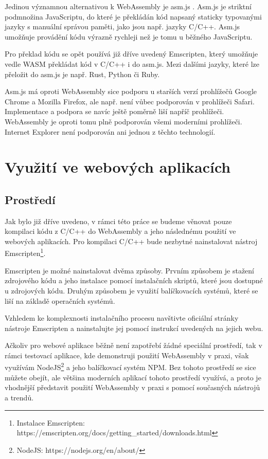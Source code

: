 \documentclass{{template/ctuthesis}}
\begin{document}
Jedinou významnou alternativou k WebAssembly je asm.js \cite{asm-js}. Asm.js je striktní podmnožina JavaScriptu, do které je překládán kód napsaný staticky typovanými jazyky s manuální správou paměti, jako jsou např. jazyky C/C++. Asm.js umožňuje provádění kódu výrazně rychleji než je tomu u běžného JavaScriptu.

Pro překlad kódu se opět používá již dříve uvedený Emscripten, který umožňuje vedle WASM překládat kód v C/C++ i do asm.js. Mezi dalšími jazyky, které lze přeložit do asm.js je např. Rust, Python či Ruby.

Asm.js má oproti WebAssembly sice podporu u starších verzí prohlížečů Google Chrome a Mozilla Firefox, ale např. není vůbec podporován v prohlížeči Safari. Implementace a podpora se navíc ještě poměrně liší napříč prohlížeči. WebAssembly je oproti tomu plně podporován všemi moderními prohlížeči. Internet Explorer není podporován ani jednou z těchto technologií.


\chapter{Využití ve webových aplikacích}

\section{Prostředí}

Jak bylo již dříve uvedeno, v rámci této práce se budeme věnovat pouze kompilaci kódu z C/C++ do WebAssembly a jeho následnému použití ve webových aplikacích. Pro kompilaci C/C++ bude nezbytné nainstalovat nástroj Emscripten\footnote{Instalace Emscripten: https://emscripten.org/docs/getting\_started/downloads.html}.

Emscripten je možné nainstalovat dvěma způsoby. Prvním způsobem je stažení zdrojového kódu a jeho instalace pomocí instalačních skriptů, které jsou dostupné u zdrojových kódu. Druhým způsobem je využití balíčkovacích systémů, které se liší na základě operačních systémů.

Vzhledem ke komplexnosti instalačního procesu navštivte oficiální stránky nástroje Emscripten a nainstalujte jej pomocí instrukcí uvedených na jejich webu.

Ačkoliv pro webové aplikace běžně není zapotřebí žádné speciální prostředí, tak v rámci testovací aplikace, kde demonstruji použití WebAssembly v praxi, však využívám NodeJS\footnote{NodeJS: https://nodejs.org/en/about/} a jeho balíčkovací systém NPM. Bez tohoto prostředí se sice můžete obejít, ale většina moderních aplikací tohoto prostředí využívá, a proto je vhodnější představit použití WebAssembly v praxi s pomocí současných nástrojů a trendů.
\end{document}

